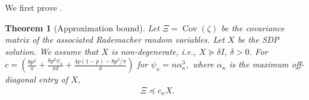 \documentclass[12pt]{article}
\newtheorem{theorem}{Theorem}
\theoremstyle{definition}
\numberwithin{equation}{section}
\numberwithin{figure}{section}
\numberwithin{equation}{section}
\numberwithin{figure}{section}
\begin{document}
We first prove .

\begin{theorem}[Approximation bound] \label{thm:approximation_error}
Let $\Xi = \operatorname{Cov}(\zeta)$ be the covariance matrix of the associated Rademacher random variables. Let $X$ be the SDP solution. We assume that $X$ is non-degenerate, i.e., $X \succeq \delta I$, $\delta > 0$. For $c = \left( \frac{8p^2}{\pi}  + \frac{8p^2 \psi_\kappa}{\pi \delta} + \frac{4p(1-p) - 8p^2/\pi}{\delta}  \right)$ for $\psi_\kappa= n \alpha_\kappa^{3},$ where $\alpha_\kappa$ is the maximum off-diagonal entry of $X$,
\begin{align*}
    \Xi \preceq c_\kappa X.
\end{align*}
\end{theorem}
\end{document}
